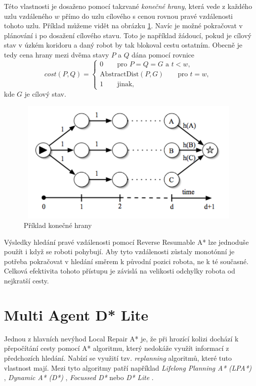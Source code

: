 Této vlastnosti je dosaženo pomocí takzvané \emph{konečné hrany}, která vede z každého uzlu vzdáleného $w$ přímo do uzlu cílového s cenou rovnou pravé vzdálenosti tohoto uzlu. Příklad můžeme vidět na obrázku \ref{obr:terminalEdge}. Navíc je možné pokračovat v plánování i po dosažení cílového stavu. Toto je například žádoucí, pokud je cílový stav v úzkém koridoru a daný robot by tak blokoval cestu ostatním. Obecně je tedy cena hrany mezi dvěma stavy $P$ a $Q$ dána pomocí rovnice
\begin{equation}
cost\left(P,Q\right)=\begin{cases}
0 \qquad \text{pro }P=Q=G\text{ a }t<w, \\
\text{AbstractDist}\left(P,G\right) \qquad \text{pro }t=w, \\
1 \qquad \text{jinak},
\end{cases}
\end{equation}
kde $G$ je cílový stav.

\begin{figure}[htb]
	\begin{center}
		\includegraphics*[width=15cm,height=6cm,keepaspectratio]{obr/terminalEdge}
	\end{center}
	\caption[caption]{Příklad konečné hrany \cite{Silver2006}}
	\label{obr:terminalEdge}
\end{figure}

Výsledky hledání pravé vzdálenosti pomocí Reverse Resumable A* lze jednoduše použít i když se roboti pohybují. Aby tyto vzdálenosti zůstaly monotónní je potřeba pokračovat v hledání směrem k původní pozici robota, ne k té současné. Celková efektivita tohoto přístupu je závislá na velikosti odchylky robota od nejkratší cesty.

\section{Multi Agent D* Lite}
Jednou z hlavních nevýhod Local Repair A* je, že při hrozící kolizi dochází k přepočítání cesty pomocí A* algoritmu, který nedokáže využít informací z předchozích hledání. Nabízí se využití tzv. \emph{replanning} algoritmů, které tuto vlastnost mají. Mezi tyto algoritmy patří například \emph{Lifelong Planning A* (LPA*)} \cite{Koenig2004}, \emph{Dynamic A* (D*)} \cite{Stentz1997}, \emph{Focussed D*} \cite{Stentz1995} nebo \emph{D* Lite} \cite{Koenig2002}.


